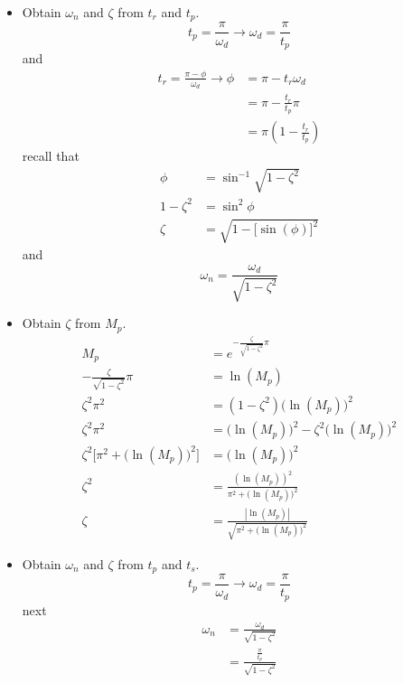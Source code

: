 \documentclass[12pt,letter]{article}
\numberwithin{ex}{section} %
\numberwithin{re}{section} %
\numberwithin{equation}{section}	%
\begin{document}
\begin{itemize}
\item Obtain $\omega_n$ and $\zeta$ from $t_r$ and $t_p$.  
\begin{equation}
t_p = \frac{\pi}{\omega_d} \rightarrow \omega_d = \frac{\pi}{t_p}
\end{equation}
and
\begin{align}
t_r  = \frac{\pi - \phi}{\omega_d} \rightarrow \phi &= \pi - t_r \omega_d  \\
 &= \pi -\frac{t_r}{t_p} \pi \nonumber \\
 &= \pi(1-\frac{t_r}{t_p}) \nonumber 
\end{align}
recall that 
\begin{align}
\phi &= \sin^{-1} \sqrt{1-\zeta^2} \\
1-\zeta^2 &= \sin^2 \phi \nonumber \\
\zeta &= \sqrt{1-\big[\sin (\phi)\big]^2}
\end{align}
and
\begin{equation}
\omega_n = \frac{\omega_d}{\sqrt{1-\zeta^2}}
\end{equation}
\item  Obtain $\zeta$ from $M_p$.  
\begin{align}
M_p  &= e^{- \frac{\zeta}{\sqrt{1-\zeta^2}} \pi } \\
- \frac{\zeta}{\sqrt{1-\zeta^2}} \pi  &= \ln(M_p) \nonumber \\
\zeta^2 \pi^2 &= (1-\zeta^2)\big(\ln(M_p)\big)^2  \nonumber \\
\zeta^2 \pi^2 &= \big(\ln(M_p)\big)^2  - \zeta^2 \big(\ln(M_p)\big)^2  \nonumber \\
\zeta^2 \bigg[\pi^2 + \big(\ln(M_p)\big)^2 \bigg] &= \big(\ln(M_p)\big)^2   \nonumber \\
\zeta^2 &= \frac{(\ln(M_p))^2}{\pi^2 + \big(\ln(M_p)\big)^2 }    \nonumber \\
\zeta &= \frac{|\ln(M_p)|}{\sqrt{\pi^2 + \big(\ln(M_p)\big)^2 }}    \nonumber
\end{align}
\item Obtain $\omega_n$ and $\zeta$ from $t_p$ and $t_s$.  
\begin{equation}
t_p = \frac{\pi}{\omega_d} \rightarrow \omega_d = \frac{\pi}{t_p}
\end{equation}
next
\begin{align}
\omega_n &= \frac{\omega_d}{\sqrt{1-\zeta^2}} \\
&= \frac{\frac{\pi}{t_p}}{ \sqrt{1-\zeta^2}}  \nonumber \\

\end{align}
\end{itemize}
\end{document}
